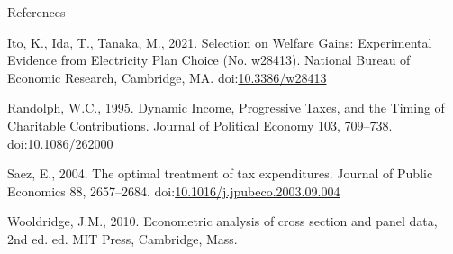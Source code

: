 \documentclass[
  ignorenonframetext,
  aspectratio=169,
]{beamer}
\newlength{\cslhangindent}
\newlength{\cslentryspacingunit} %
\newenvironment{CSLReferences}[2] %
 {%
  \setlength{\parindent}{0pt}
  \ifodd #1
  \let\oldpar\par
  \def\par{\hangindent=\cslhangindent\oldpar}
  \fi
  \setlength{\parskip}{#2\cslentryspacingunit}
 }%
 {}
\begin{document}
\begin{frame}{References}
\begin{CSLReferences}{1}{0}
\leavevmode{}%
Ito, K., Ida, T., Tanaka, M., 2021. Selection on {Welfare Gains}: {Experimental Evidence} from {Electricity Plan Choice} (No. w28413). {National Bureau of Economic Research}, {Cambridge, MA}. doi:\href{https://doi.org/10.3386/w28413}{10.3386/w28413}

\leavevmode{}%
Randolph, W.C., 1995. Dynamic {Income}, {Progressive Taxes}, and the {Timing} of {Charitable Contributions}. Journal of Political Economy 103, 709--738. doi:\href{https://doi.org/10.1086/262000}{10.1086/262000}

\leavevmode{}%
Saez, E., 2004. The optimal treatment of tax expenditures. Journal of Public Economics 88, 2657--2684. doi:\href{https://doi.org/10.1016/j.jpubeco.2003.09.004}{10.1016/j.jpubeco.2003.09.004}

\leavevmode{}%
Wooldridge, J.M., 2010. Econometric analysis of cross section and panel data, 2nd ed. ed. {MIT Press}, {Cambridge, Mass}.

\end{CSLReferences}
\end{frame}
\end{document}
